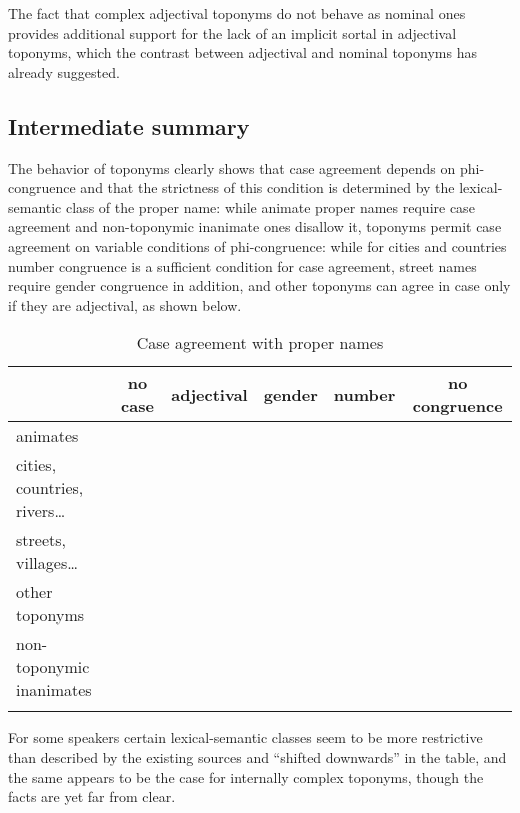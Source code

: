 \documentclass[output=paper,colorlinks,citecolor=brown]{langscibook}
\begin{document}
\noindent The fact that complex adjectival toponyms do not behave as nominal ones provides additional support for the lack of an implicit sortal in adjectival toponyms, which the contrast between adjectival and nominal toponyms has already suggested.

\subsection{Intermediate summary}\label{mat:sec:intermediate-summary}
\begin{sloppypar}
The behavior of toponyms clearly shows that case agreement depends on phi-congruence and that the strictness of this condition is determined by the lexical-semantic class of the proper name: while animate proper names require case agreement and non-toponymic inanimate ones disallow it, toponyms permit case agreement on variable conditions of phi-congruence: while for cities and countries number congruence is a sufficient condition for case agreement, street names require gender congruence in addition, and other toponyms can agree in case only if they are adjectival, as shown below. 
\end{sloppypar}

\begin{table}
\caption{Case agreement with proper names}
\label{mat:tab:Case-agreement-proper-names}
\begin{tabularx}{\textwidth}{l@{}C@{~}C@{~}C@{~}C@{~}C} 
  \lsptoprule
   & no case  & \minsp{$+$} adjectival & gender  & number & no congruence\\
  \midrule
  animates  &     &      &         &  & \\
  cities, countries, rivers…  &    &     &         &  & \\
  streets, villages…  &    &     &         &  & \\
  other toponyms  &    &     &         &  & \\
  non-toponymic inanimates  &    &     &         &  & \\
  \lspbottomrule
 \end{tabularx}
\end{table}

For some speakers certain lexical-semantic classes seem to be more restrictive than described by the existing sources and “shifted downwards” in the table, and the same appears to be the case for internally complex toponyms, though the facts are yet far from clear.
\end{document}
